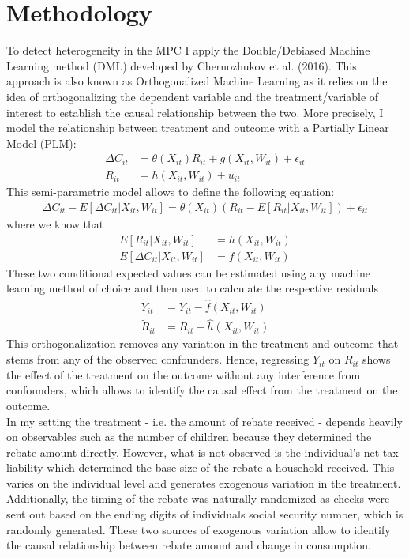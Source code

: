 \section*{Methodology}
To detect heterogeneity in the MPC I apply the Double/Debiased Machine Learning method (DML) developed by Chernozhukov et al. (2016). This approach is also known as Orthogonalized Machine Learning as it relies on the idea of orthogonalizing the dependent variable and the treatment/variable of interest to establish the causal relationship between the two. More precisely, I model the relationship between treatment and outcome with a Partially Linear Model (PLM): 
\begin{align}
    \Delta C_{it}&=\theta(X_{it})R_{it}+g(X_{it}, W_{it})+\epsilon_{it} \\
    R_{it}&=h(X_{it}, W_{it})+u_{it}
\end{align}
This semi-parametric model allows to define the following equation: 
\begin{align}
    \Delta C_{it}-E[\Delta C_{it}|X_{it}, W_{it}]=\theta(X_{it})(R_{it}-E[R_{it}|X_{it}, W_{it}])+\epsilon_{it}
\end{align}
where we know that 
\begin{align}
    E[R_{it}|X_{it}, W_{it}]&=h(X_{it}, W_{it}) \\
    E[\Delta C_{it}|X_{it}, W_{it}]&=f(X_{it}, W_{it})
\end{align}
These two conditional expected values can be estimated using any machine learning method of choice and then used to calculate the respective residuals
\begin{align}
    \tilde{Y}_{it}&=Y_{it}-\hat{f}(X_{it}, W_{it})\\
    \tilde{R}_{it}&=R_{it}-\hat{h}(X_{it}, W_{it})
\end{align}
This orthogonalization removes any variation in the treatment and outcome that stems from any of the observed confounders. Hence, regressing $\tilde{Y}_{it}$ on $\tilde{R}_{it}$ shows the effect of the treatment on the outcome without any interference from confounders, which allows to identify the causal effect from the treatment on the outcome. \\
In my setting the treatment - i.e. the amount of rebate received - depends heavily on observables such as the number of children because they determined the rebate amount directly. However, what is not observed is the individual's net-tax liability which determined the base size of the rebate a household received. This varies on the individual level and generates exogenous variation in the treatment. Additionally, the timing of the rebate was naturally randomized as checks were sent out based on the ending digits of individuals social security number, which is randomly generated. These two sources of exogenous variation allow to identify the causal relationship between rebate amount and change in consumption. \\

